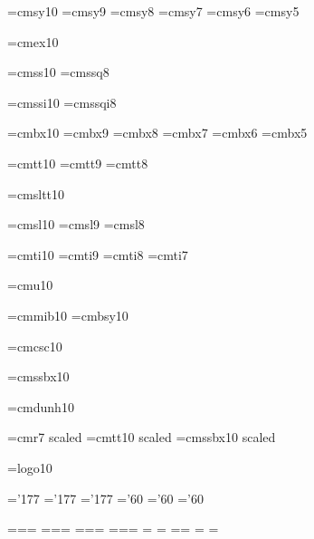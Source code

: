 \font\tensy=cmsy10 %
\font\preloaded=cmsy9
\font\preloaded=cmsy8
\font\sevensy=cmsy7
\font\preloaded=cmsy6
\font\fivesy=cmsy5

\font\tenex=cmex10 %

\font\preloaded=cmss10 %
\font\preloaded=cmssq8

\font\preloaded=cmssi10 %
\font\preloaded=cmssqi8

\font\tenbf=cmbx10 %
\font\preloaded=cmbx9
\font\preloaded=cmbx8
\font\sevenbf=cmbx7
\font\preloaded=cmbx6
\font\fivebf=cmbx5

\font\tentt=cmtt10 %
\font\preloaded=cmtt9
\font\preloaded=cmtt8

\font\preloaded=cmsltt10 %

\font\tensl=cmsl10 %
\font\preloaded=cmsl9
\font\preloaded=cmsl8

\font\tenit=cmti10 %
\font\preloaded=cmti9
\font\preloaded=cmti8
\font\preloaded=cmti7

\font\preloaded=cmu10 %

\font\preloaded=cmmib10 %
\font\preloaded=cmbsy10 %

\font\preloaded=cmcsc10 %

\font\preloaded=cmssbx10 %

\font\preloaded=cmdunh10 %

\font\preloaded=cmr7 scaled  %
\font\preloaded=cmtt10 scaled 
\font\preloaded=cmssbx10 scaled 

\font\preloaded=logo10 %


\let\preloaded=\undefined %

\skewchar\teni='177 \skewchar\seveni='177 \skewchar\fivei='177
\skewchar\tensy='60 \skewchar\sevensy='60 \skewchar\fivesy='60

=\tenrm {}=\sevenrm {}=\fiverm
\def\rm{\fam\z@\tenrm}
=\teni {}=\seveni {}=\fivei
\def\mit{\fam\@ne} \def\oldstyle{\fam\@ne\teni}
=\tensy {}=\sevensy {}=\fivesy
\def\cal{\fam\tw@}
=\tenex {}=\tenex {}=\tenex
\newfam\itfam \def\it{\fam\itfam\tenit} %
\textfont\itfam=\tenit
\newfam\slfam \def\sl{\fam\slfam\tensl} %
\textfont\slfam=\tensl
\newfam\bffam \def\bf{\fam\bffam\tenbf} %
\textfont\bffam=\tenbf \scriptfont\bffam=\sevenbf
\scriptscriptfont\bffam=\fivebf
\newfam\ttfam \def\tt{\fam\ttfam\tentt} %
\textfont\ttfam=\tentt

